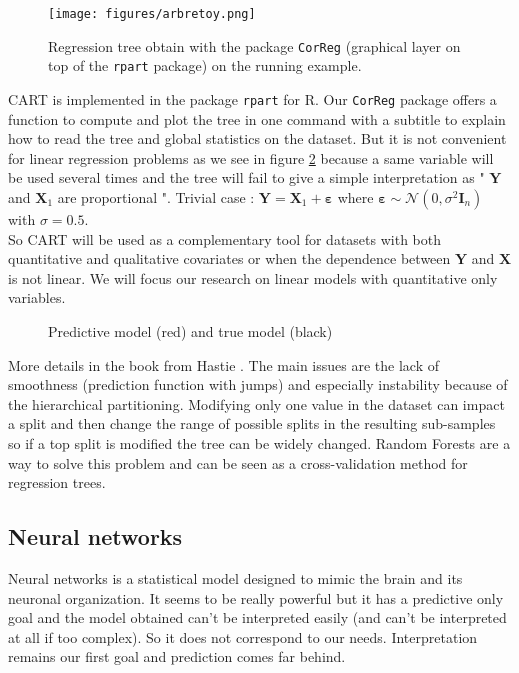 \documentclass[12pt,a4paper]{report}
\begin{document}
		\begin{figure}
			\centering
				\texttt{[image: figures/arbretoy.png]} 
			\caption{Regression tree obtain with the package {\tt CorReg}
			 (graphical layer on top of  the {\tt rpart} package) on the running example.}\label{arbretoy}
		\end{figure}
		CART is implemented in the package {\tt rpart} 
		for R. Our {\tt CorReg} 
		package offers a function to compute and plot the tree in one command with a subtitle to explain how to read the tree and global statistics on the dataset.
		But it is not convenient for linear regression problems as we see in figure \ref{arbretrivial} because a same variable will be used several times and the tree will fail to give a simple interpretation as " $\boldsymbol{Y}$ and $\boldsymbol{X}_1$ are proportional ". Trivial case : $\boldsymbol{Y}=\boldsymbol{X}_1 + \boldsymbol{\varepsilon}$ where $\boldsymbol{\varepsilon} \sim \mathcal{N}(0, \sigma^2 \boldsymbol{I}_n)$ with $\sigma=0.5$. \\
		So CART will be used as a complementary tool for datasets with both quantitative and qualitative covariates or when the dependence between $\boldsymbol{Y}$ and $\boldsymbol{X}$ is not linear. We will focus our research on linear models with quantitative only variables.
	
\begin{figure}[h!]
	 \quad
	\caption{Predictive model (red) and true model (black)}\label{arbretrivial}
\end{figure}

More details in the book from Hastie \cite{hastie2009elements}. The main issues are the lack of smoothness (prediction function with jumps) and especially instability because of the hierarchical partitioning. Modifying only one value in the dataset can impact a split and then change the range of possible splits in the resulting sub-samples so if a top split is modified the tree can be widely changed. Random Forests are a way to solve this problem and can be seen as a cross-validation method for regression trees.
	
	\subsection{Neural networks}	
		Neural networks \cite{fausett1994fundamentals} is a statistical model designed to mimic the brain and its neuronal organization. It seems to be really powerful but it has a predictive only goal and the model obtained can't be interpreted easily (and can't be interpreted at all if too complex). So it does not correspond to our needs. Interpretation remains our first goal and prediction comes far behind.
		
\end{document}
